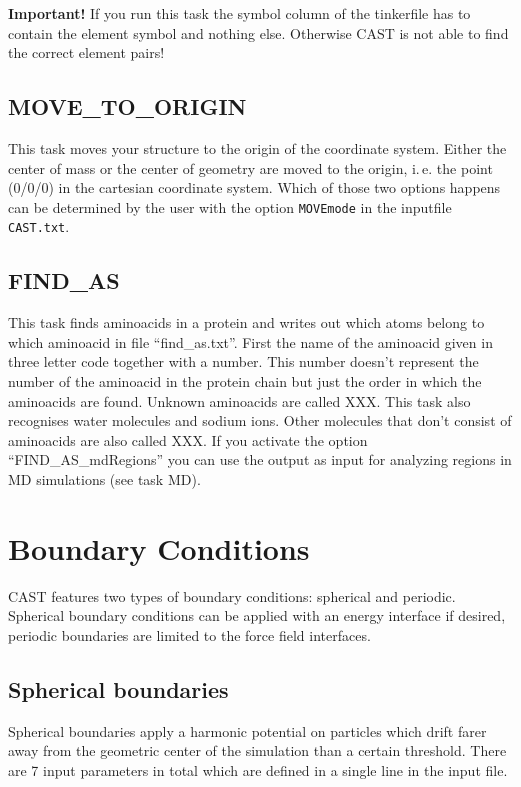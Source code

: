 \documentclass[10pt,a4paper]{article} %
\begin{document}
\textbf{Important!} If you run this task the symbol column of the tinkerfile has to contain the element symbol and nothing else. Otherwise CAST is not able to find the correct element pairs!

\subsection{MOVE\_TO\_ORIGIN}

This task moves your structure to the origin of the coordinate system. Either the center of mass or the center of geometry are moved to the origin, i.\,e. the point (0/0/0) in the cartesian coordinate system. Which of those two options happens can be determined by the user with the option \texttt{MOVEmode} in the inputfile \texttt{CAST.txt}.

\subsection{FIND\_AS}

This task finds aminoacids in a protein and writes out which atoms belong to which aminoacid in file ``find\_as.txt''. First the name of the aminoacid given in three letter code together with a number. This number doesn't represent the number of the aminoacid in the protein chain but just the order in which the aminoacids are found. Unknown aminoacids are called XXX. This task also recognises water molecules and sodium ions. Other molecules that don't consist of aminoacids are also called XXX. If you activate the option ``FIND\_AS\_mdRegions'' you can use the output as input for analyzing regions in MD simulations (see task MD).
		

	\section{Boundary Conditions}
	\label{sec:boundary}
	\ac{CAST} features two types of boundary conditions: spherical and periodic. Spherical boundary conditions can be applied with an energy interface if desired, periodic boundaries are limited to the force field interfaces.

	\subsection{Spherical boundaries}
	Spherical boundaries apply a harmonic potential on particles which drift farer away from the geometric center of the simulation than a certain threshold. There are 7 input parameters in total which are defined in a single line in the input file. \\~\\
\end{document}

